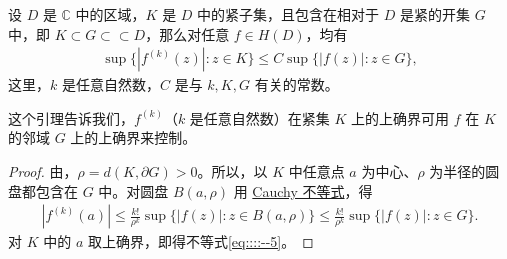 \documentclass[../../main.tex]{subfiles}%
\begin{document}
\begin{lemma}\label{lemma:引理4.1.8}
设 \( D \) 是 \( \mathbb{C} \) 中的区域，\( K \) 是 \( D \) 中的紧子集，且包含在相对于 \( D \) 是紧的开集 \( G \) 中，即 \( K \subset G \subset\subset D \)，那么对任意 \( f \in H(D) \)，均有
\begin{align}
\sup\{|f^{(k)}(z)| : z \in K\} \leqslant C\sup\{|f(z)| : z \in G\},\label{eq::::--5}
\end{align}
这里，\( k \) 是任意自然数，\( C \) 是与 \( k, K, G \) 有关的常数。
\end{lemma}
\begin{note}
这个引理告诉我们，\( f^{(k)} \)（\( k \) 是任意自然数）在紧集 \( K \) 上的上确界可用 \( f \) 在 \( K \) 的邻域 \( G \) 上的上确界来控制。
\end{note}
\begin{proof}

由，\( \rho = d(K, \partial G) > 0 \)。所以，以 \( K \) 中任意点 \( a \) 为中心、\( \rho \) 为半径的圆盘都包含在 \( G \) 中。对圆盘 \( B(a, \rho) \) 用 \hyperref[theorem:Cauchy不等式(离散版)-复变函数]{Cauchy 不等式}，得
\begin{align*}
|f^{(k)}(a)| \leqslant \frac{k!}{\rho^k}\sup\{|f(z)| : z \in B(a, \rho)\} \leqslant \frac{k!}{\rho^k}\sup\{|f(z)| : z \in G\}.
\end{align*}
对 \( K \) 中的 \( a \) 取上确界，即得不等式\eqref{eq::::--5}。

\end{proof}
\end{document}
